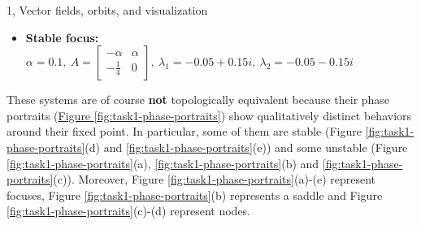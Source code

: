 \documentclass[10pt,a4paper]{article}
\begin{document}
\begin{task}{1, Vector fields, orbits, and visualization}
\begin{itemize}
    \item \textbf{Stable focus:} $\alpha=0.1,\ A=
    \begin{bmatrix}
    -\alpha & \alpha \\
    -\frac{1}{4} & 0
    \end{bmatrix},\
    \lambda_1 = -0.05+0.15i,\ \lambda_2 = -0.05-0.15i$
\end{itemize}
These systems are of course \textbf{not} topologically equivalent because their phase portraits (\hyperref[fig:task1-phase-portraits]{Figure \ref{fig:task1-phase-portraits}}) show qualitatively distinct behaviors around their fixed point.
In particular, some of them are stable (Figure \ref{fig:task1-phase-portraits}(d) and \ref{fig:task1-phase-portraits}(e)) and some unstable (Figure \ref{fig:task1-phase-portraits}(a), \ref{fig:task1-phase-portraits}(b) and \ref{fig:task1-phase-portraits}(c)).
Moreover, Figure \ref{fig:task1-phase-portraits}(a)-(e) represent focuses,
Figure  \ref{fig:task1-phase-portraits}(b) represents a saddle and Figure \ref{fig:task1-phase-portraits}(c)-(d) represent nodes.


\end{task}
\end{document}
